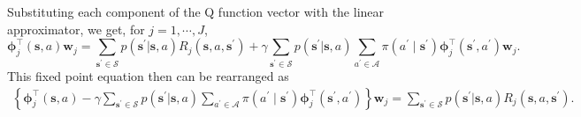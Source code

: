 \documentclass{article}
\newcommand{\wh}{\widehat}
\newcommand{\p}{\prime}
\newcommand{\bs}{ \boldsymbol}
\newcommand{\ml}{\mathcal}
\newcommand{\lt}{\left}
\newcommand{\rt}{\right}
\begin{document}
Substituting each component of the Q function vector with the linear approximator, we get, for $j = 1, \cdots, J$,
$$\bs{\phi}_j^\intercal(\bs{s},a)\bs{w}_j  =\sum_{\bs{s}^{\prime} \in \bs{\ml{S}}}  p(\bs{s}^{\prime} | \bs{s}, a)  R_j(\bs{s}, a, \bs{s}^{\prime}) + \gamma \sum_{\bs{s}^{\prime} \in \bs{\ml{S}}}  p(\bs{s}^{\prime} | \bs{s}, a)  \sum_{a^{\p} \in \ml{A}} \pi(a^{\prime} \mid \bs{s}^{\p} )  \bs{\phi}_j^\intercal(\bs{s}^{\prime}, a^{\prime})\bs{w}_j.$$
This fixed point equation then can be rearranged as
\begin{equation}
\begin{gathered}
 \lt\{\bs{\phi}_j^\intercal(\bs{s},a) - \gamma \sum_{\bs{s}^{\prime} \in \bs{\ml{S}}}  p(\bs{s}^{\prime} | \bs{s}, a)  \sum_{a^{\p} \in \ml{A}} \pi(a^{\prime} \mid \bs{s}^{\p} )  \bs{\phi}_j^\intercal(\bs{s}^{\prime}, a^{\prime})\rt\}\bs{w}_j =\sum_{\bs{s}^{\prime} \in \bs{\ml{S}}}  p(\bs{s}^{\prime} | \bs{s}, a) R_j(\bs{s}, a, \bs{s}^{\prime}).
 \end{gathered}
\end{equation}
\end{document}
